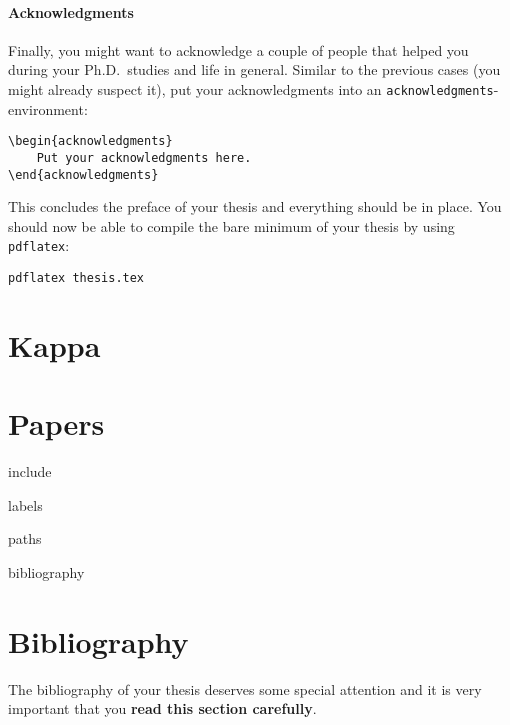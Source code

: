 \paragraph{Acknowledgments} Finally, you might want to acknowledge a couple of people that helped you during your Ph.D.\ studies and life in general. Similar to the previous cases (you might already suspect it), put your acknowledgments into an \texttt{acknowledgments}-environment:
%
\begin{lstlisting}
\begin{acknowledgments}
    Put your acknowledgments here.
\end{acknowledgments}
\end{lstlisting}

This concludes the preface of your thesis and everything should be in place. You should now be able to compile the bare minimum of your thesis by using \texttt{pdflatex}:
%
\begin{verbatim}
pdflatex thesis.tex
\end{verbatim}


\section{Kappa}



\section{Papers}

include

labels

paths

bibliography


\section{Bibliography}
The bibliography of your thesis deserves some special attention and it is very important that you \textbf{read this section carefully}.


